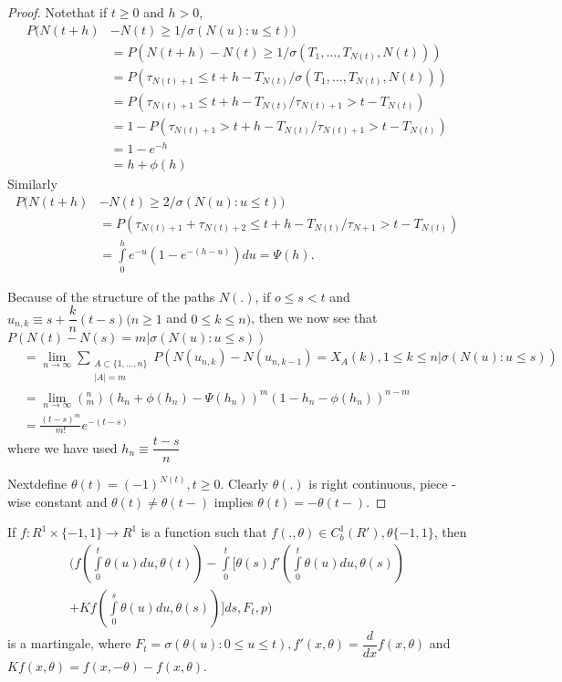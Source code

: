 \begin{proof}
Note\pageoriginale that if $t \geq 0 $ and $h > 0$,
\begin{align*}
P(N(t+h) & - N(t) \geq 1/ \sigma (N(u) : u \leq t))\\
& = P(N(t+h)-N(t) \geq 1 / \sigma (T_1,\ldots ,T_{N(t)}, N(t))) \\
& = P(\tau _{N(t)+1} \leq t+h-T_{N(t)}/ \sigma(T_1,\ldots, T_{N(t)}, N(t)))\\
& = P(\tau _{N(t)+1} \leq t+h-T_{N(t)}/ \tau_{N(t)+1}> t - T_{N(t)})\\
& = 1-P(\tau_{N(t)+1} > t+h -T_{N(t)} /\tau_{N(t)+1}>t -T_{N(t)})\\
& = 1-e^{-h}\\
& = h+ \phi(h)
\end{align*}
Similarly
\begin{align*}
P(N(t+h) & - N(t) \ge 2/ \sigma (N(u) : u \le t))\\ 
& = P(\tau_{N(t)+1} + \tau_{N(t)+2} \le t+h - T_{N(t)}/ \tau_{N+1} >
t-T_{N(t)})\\ 
& = \int \limits^h_0 e^{-u}(1-e^{-(h-u)})du = \Psi (h). 
\end{align*}

Because of the structure of the paths $N(.)$, if $o \leq s < t$ and
$u_{n,k}\equiv s+ \dfrac{k}{n}(t-s)(n \geq 1 $ and $0 \leq k \leq n)$,
then we now see that $P(N(t)-N(s) = m| \sigma(N(u):u \leq s))$ 
{\fontsize{10pt}{12pt}\selectfont
\begin{align*}
& =\lim_{n \to \infty} \sum _{\substack { A \subset \{1, \ldots ,n\}
      \\ { |A| =m}}}P(N(u_{n,k})-N(u_{n,k-1}) =X_A(k), 1 \leq k \leq n
  | \sigma (N(u):u \leq s))\\ 
& =\lim_{n \to \infty}(^n_m)(h_n + \phi (h_n) - \Psi
  (h_n))^m(1-h_n-\phi (h_n))^{n-m}\\ 
& = \frac{(t-s)^m}{m!}e^{-(t-s)}
\end{align*}}\relax
where we have used $h_n \equiv \dfrac{t-s}{n}$

Next\pageoriginale define $\theta (t) = (-1)^{N(t)}, t \ge 0$. Clearly
$\theta(.)$ 
is right continuous, piece -wise constant and $\theta(t) \neq \theta
(t -)$ implies $\theta(t) = - \theta (t -)$. 
\end{proof}

\setcounter{lemma}{2}
\begin{lemma}\label{chap2:lem2.3}%
If $f: R^1 \times \{ -1,  1 \} \rightarrow R^1$ is a function such
that $f(., \theta) \in C^1_b(R'), \theta \{ -1,1 \}$, then 
\begin{multline*}
(f(\int \limits^t_0 \theta(u)du, \theta(t)) - \int \limits^t_0 [\theta
  (s) f' (\int \limits^t_0 \theta (u) du, \theta(s))\\
  + Kf(\int
  \limits^s_0 \theta(u)du, \theta(s))]ds, F_t , p) 
\end{multline*}
is a martingale, where $F_t = \sigma(\theta(u): 0 \le u \le t), f'(x,
\theta) = \dfrac{d}{dx}f(x,\theta)$ and $Kf(x, \theta) = f(x, -\theta)
- f(x, \theta)$. 
\end{lemma}

